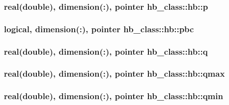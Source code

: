 \hypertarget{structhb__class_1_1hb_a138a258ac48be2d660556d987230a7b6}{
\subsubsection[{p}]{\setlength{\rightskip}{0pt plus 5cm}real(double), dimension(\-:), pointer hb\-\_\-class\-::hb\-::p\hspace{0.3cm}{\ttfamily [private]}}}\label{structhb__class_1_1hb_a138a258ac48be2d660556d987230a7b6}
\hypertarget{structhb__class_1_1hb_a076ab9d7a6a36a40529405c6fea62d70}{
\subsubsection[{pbc}]{\setlength{\rightskip}{0pt plus 5cm}logical, dimension(\-:), pointer hb\-\_\-class\-::hb\-::pbc\hspace{0.3cm}{\ttfamily [private]}}}\label{structhb__class_1_1hb_a076ab9d7a6a36a40529405c6fea62d70}
\hypertarget{structhb__class_1_1hb_aeb58002dd58afd2c2930db42209f19df}{
\subsubsection[{q}]{\setlength{\rightskip}{0pt plus 5cm}real(double), dimension(\-:), pointer hb\-\_\-class\-::hb\-::q\hspace{0.3cm}{\ttfamily [private]}}}\label{structhb__class_1_1hb_aeb58002dd58afd2c2930db42209f19df}
\hypertarget{structhb__class_1_1hb_a097cb0c17e9a6557efa84d638650899b}{
\subsubsection[{qmax}]{\setlength{\rightskip}{0pt plus 5cm}real(double), dimension(\-:), pointer hb\-\_\-class\-::hb\-::qmax\hspace{0.3cm}{\ttfamily [private]}}}\label{structhb__class_1_1hb_a097cb0c17e9a6557efa84d638650899b}
\hypertarget{structhb__class_1_1hb_ad39d5d28f5be03c2bc6d00ecbc847e72}{
\subsubsection[{qmin}]{\setlength{\rightskip}{0pt plus 5cm}real(double), dimension(\-:), pointer hb\-\_\-class\-::hb\-::qmin\hspace{0.3cm}{\ttfamily [private]}}}\label{structhb__class_1_1hb_ad39d5d28f5be03c2bc6d00ecbc847e72}
